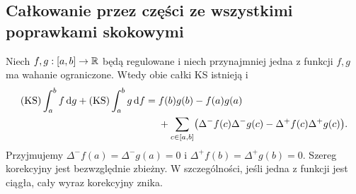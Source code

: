 \subsection*{Całkowanie przez części ze wszystkimi poprawkami skokowymi}
\begin{twierdzenie}
\label{tw:ks-ibp}
Niech $f,g:[a,b]\to\mathbb R$ będą regulowane i niech przynajmniej jedna z funkcji $f,g$ ma wahanie ograniczone. Wtedy obie całki KS istnieją i
\[
 \begin{aligned}
 (\mathrm{KS})\int_a^b f\,\mathrm dg+(\mathrm{KS})\int_a^b g\,\mathrm df
 ={}&f(b)g(b)-f(a)g(a)\\
 &+\sum_{c\in[a,b]}\bigl(\Delta^-f(c)\Delta^-g(c)
 -\Delta^+f(c)\Delta^+g(c)\bigr).
 \end{aligned}
\]
Przyjmujemy $\Delta^-f(a)=\Delta^-g(a)=0$ i $\Delta^+f(b)=\Delta^+g(b)=0$. Szereg korekcyjny jest bezwzględnie zbieżny. W szczególności, jeśli jedna z funkcji jest ciągła, cały wyraz korekcyjny znika.
\end{twierdzenie}
